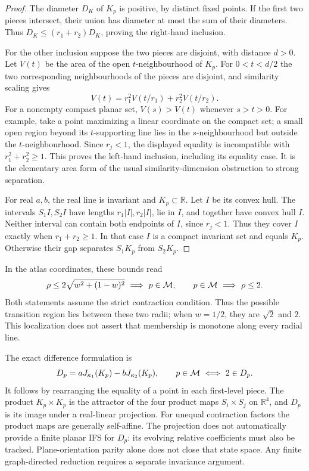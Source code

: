 \begin{proof}
The diameter $D_K$ of $K_p$ is positive, by distinct fixed points.
If the first two pieces intersect, their union has diameter at most
the sum of their diameters. Thus
$D_K\le(r_1+r_2)D_K$, proving the right-hand inclusion.

For the other inclusion suppose the two pieces are disjoint, with
distance $d>0$. Let $V(t)$ be the area of the open $t$-neighbourhood
of $K_p$. For $0<t<d/2$ the two corresponding neighbourhoods of the
pieces are disjoint, and similarity scaling gives
\[
V(t)=r_1^2V(t/r_1)+r_2^2V(t/r_2).
\]
For a nonempty compact planar set, $V(s)>V(t)$ whenever $s>t>0$.
For example, take a point maximizing a linear coordinate on the
compact set; a small open region beyond its $t$-supporting line lies
in the $s$-neighbourhood but outside the $t$-neighbourhood. Since
$r_j<1$, the displayed equality is incompatible with
$r_1^2+r_2^2\ge1$. This proves the left-hand inclusion, including
its equality case. It is the elementary area form of the usual
similarity-dimension obstruction to strong separation.

For real $a,b$, the real line is invariant and $K_p\subset\mathbb R$.
Let $I$ be its convex hull. The intervals $S_1I,S_2I$ have lengths
$r_1|I|,r_2|I|$, lie in $I$, and together have convex hull $I$.
Neither interval can contain both endpoints of $I$, since $r_j<1$.
Thus they cover $I$ exactly when $r_1+r_2\ge1$. In that case $I$
is a compact invariant set and equals $K_p$. Otherwise their gap
separates $S_1K_p$ from $S_2K_p$.
\end{proof}

In the atlas coordinates, these bounds read
\begin{equation}\label{eq:rho-bounds}
\rho\le2\sqrt{w^2+(1-w)^2}\ \Longrightarrow\ p\in\mathcal M,
\qquad
p\in\mathcal M\ \Longrightarrow\ \rho\le2.
\end{equation}
Both statements assume the strict contraction condition. Thus the
possible transition region lies between these two radii; when
$w=1/2$, they are $\sqrt2$ and $2$. This localization does not assert
that membership is monotone along every radial line.

The exact difference formulation is
\begin{equation}\label{eq:honest-difference}
D_p=aJ_{\kappa_1}(K_p)-bJ_{\kappa_2}(K_p),\qquad
p\in\mathcal M\ \Longleftrightarrow\ 2\in D_p.
\end{equation}
It follows by rearranging the equality of a point in each first-level
piece. The product $K_p\times K_p$ is the attractor of the four
product maps $S_i\times S_j$ on $\mathbb R^4$, and $D_p$ is its
image under a real-linear projection. For unequal contraction factors
the product maps are generally self-affine. The projection does not
automatically provide a finite planar IFS for $D_p$: its evolving
relative coefficients must also be tracked. Plane-orientation parity
alone does not close that state space. Any finite graph-directed
reduction requires a separate invariance argument.

